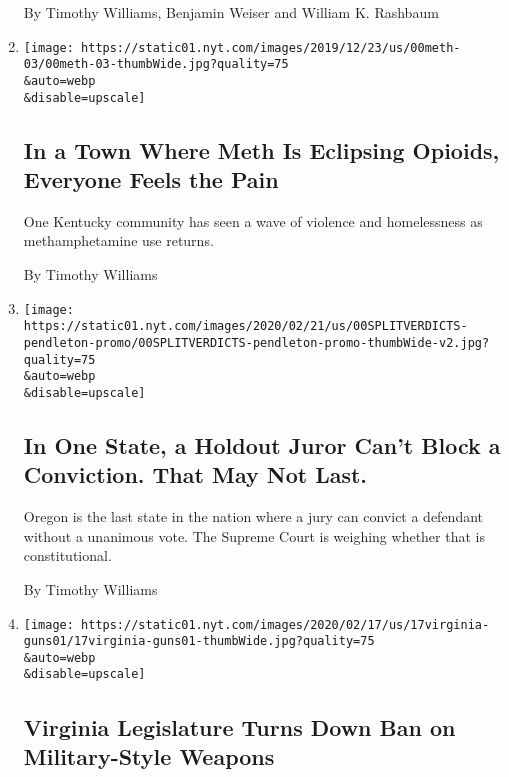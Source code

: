 \begin{enumerate}
  By Timothy Williams, Benjamin Weiser and William K. Rashbaum
\item
  \href{/2020/03/28/us/methamphetamine-kentucky-effects.html}{}

  \texttt{[image: https://static01.nyt.com/images/2019/12/23/us/00meth-03/00meth-03-thumbWide.jpg?quality=75\\\&auto=webp\\\&disable=upscale]}

  \hypertarget{in-a-town-where-meth-is-eclipsing-opioids-everyone-feels-the-pain}{%
  \subsection{In a Town Where Meth Is Eclipsing Opioids, Everyone Feels
  the
  Pain}\label{in-a-town-where-meth-is-eclipsing-opioids-everyone-feels-the-pain}}

  One Kentucky community has seen a wave of violence and homelessness as
  methamphetamine use returns.

  By Timothy Williams
\item
  \href{/2020/02/23/us/oregon-court-case-verdicts.html}{}

  \texttt{[image: https://static01.nyt.com/images/2020/02/21/us/00SPLITVERDICTS-pendleton-promo/00SPLITVERDICTS-pendleton-promo-thumbWide-v2.jpg?quality=75\\\&auto=webp\\\&disable=upscale]}

  \hypertarget{in-one-state-a-holdout-juror-cant-block-a-conviction-that-may-not-last}{%
  \subsection{In One State, a Holdout Juror Can't Block a Conviction.
  That May Not
  Last.}\label{in-one-state-a-holdout-juror-cant-block-a-conviction-that-may-not-last}}

  Oregon is the last state in the nation where a jury can convict a
  defendant without a unanimous vote. The Supreme Court is weighing
  whether that is constitutional.

  By Timothy Williams
\item
  \href{/2020/02/17/us/Virginia-assault-weapons-legislature.html}{}

  \texttt{[image: https://static01.nyt.com/images/2020/02/17/us/17virginia-guns01/17virginia-guns01-thumbWide.jpg?quality=75\\\&auto=webp\\\&disable=upscale]}

  \hypertarget{virginia-legislature-turns-down-ban-on-military-style-weapons}{%
  \subsection{Virginia Legislature Turns Down Ban on Military-Style
  Weapons}\label{virginia-legislature-turns-down-ban-on-military-style-weapons}}


\end{enumerate}
